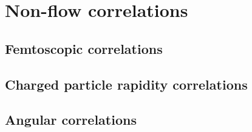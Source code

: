 \section{Non-flow correlations}
\label{secks:nonflow}
\subsection{Femtoscopic correlations}
\label{subsecks:femto}
\subsection{Charged particle rapidity correlations}
\label{subsecks:balance}
\subsection{Angular correlations}
\label{subsecks:angular}
